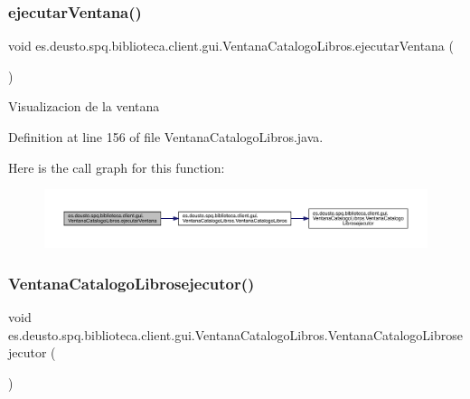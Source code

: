 \subsubsection{\texorpdfstring{ejecutar\+Ventana()}{ejecutarVentana()}}
{\footnotesize\ttfamily void es.\+deusto.\+spq.\+biblioteca.\+client.\+gui.\+Ventana\+Catalogo\+Libros.\+ejecutar\+Ventana (\begin{DoxyParamCaption}{ }\end{DoxyParamCaption})}

Visualizacion de la ventana 

Definition at line 156 of file Ventana\+Catalogo\+Libros.\+java.

Here is the call graph for this function\+:
\nopagebreak
\begin{figure}[H]
\begin{center}
\leavevmode
\includegraphics[width=350pt]{classes_1_1deusto_1_1spq_1_1biblioteca_1_1client_1_1gui_1_1_ventana_catalogo_libros_af65b1282e021cad1b3502774d5269674_cgraph}
\end{center}
\end{figure}
\mbox{\label{classes_1_1deusto_1_1spq_1_1biblioteca_1_1client_1_1gui_1_1_ventana_catalogo_libros_a269ed9764cf7fde7566c875b100ae4de}} 
\subsubsection{\texorpdfstring{Ventana\+Catalogo\+Librosejecutor()}{VentanaCatalogoLibrosejecutor()}}
{\footnotesize\ttfamily void es.\+deusto.\+spq.\+biblioteca.\+client.\+gui.\+Ventana\+Catalogo\+Libros.\+Ventana\+Catalogo\+Librosejecutor (\begin{DoxyParamCaption}{ }\end{DoxyParamCaption})}

